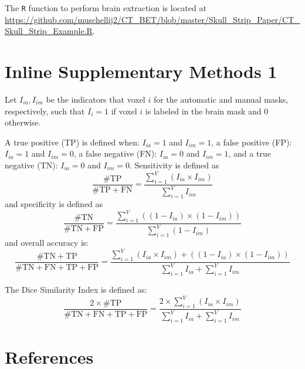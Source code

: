 \documentclass{elsarticle}\usepackage[]{graphicx}\usepackage[]{color}
\begin{document}
The \texttt{R} function to perform brain extraction is located at \url{https://github.com/muschellij2/CT_BET/blob/master/Skull_Strip_Paper/CT_Skull_Strip_Example.R}. 


\section*{Inline Supplementary Methods 1}
Let $I_{ia}, I_{im}$ be the indicators that voxel $i$ for the automatic and manual masks, respectively, such that $I_{i} = 1$ if voxel $i$ is labeled in the brain mask and $0$ otherwise.  

A true positive (TP) is defined when: $I_{ia} = 1$ and $I_{im} = 1$, a false positive (FP): $I_{ia} = 1$ and $I_{im} = 0$, a false negative (FN): $I_{ia} = 0$ and $I_{im} = 1$, and a true negative (TN): $I_{ia} = 0$ and $I_{im} = 0$.
Sensitivity is defined as
$$
\frac{\# \text{TP} }{\# \text{TP} + \text{FN}} = \frac{ \sum_{i=1}^{V} \left( I_{ia} \times I_{im}\right) }{ \sum_{i=1}^{V} I_{im}}
$$
and specificity is defined as
$$
\frac{\# \text{TN} }{\# \text{TN} + \text{FP}} = \frac{ \sum_{i=1}^{V} \left( (1-I_{ia}) \times (1- I_{im} ) \right) }{ \sum_{i=1}^{V} (1 - I_{im} )}
$$
and overall accuracy is:
$$
\frac{\# \text{TN} + \text{TP} }{\# \text{TN} + \text{FN} + \text{TP} + \text{FP}} = \frac{ \sum_{i=1}^{V} (I_{ia} \times I_{im}) + \left( (1-I_{ia}) \times (1- I_{im} ) \right) }{\sum_{i=1}^{V} I_{ia}  + \sum_{i=1}^{V} I_{im}}
$$


The Dice Similarity Index is defined as:
$$
\frac{2 \times \#\text{TP} }{ \# \text{TN} + \text{FN} + \text{TP} + \text{FP}} = \frac{ 2 \times \sum_{i=1}^{V} \left( I_{ia} \times I_{im}\right) }{\sum_{i=1}^{V} I_{ia}  + \sum_{i=1}^{V} I_{im}}
$$


\newpage
\section*{References}


\end{document}

